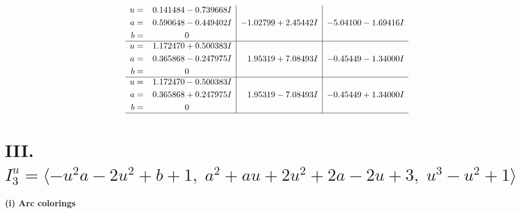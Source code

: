 \documentclass[1p]{elsarticle_modified}
\theoremstyle{definition}
\begin{document}
$$\begin{array}{c|c|c}
\begin{aligned}
u &= \phantom{-}0.141484 - 0.739668 I \\
a &= \phantom{-}0.590648 - 0.449402 I \\
b &= \phantom{-0.000000 } 0\end{aligned}
 & -1.02799 + 2.45442 I & -5.04100 - 1.69416 I \\ \hline\begin{aligned}
u &= \phantom{-}1.172470 + 0.500383 I \\
a &= \phantom{-}0.365868 - 0.247975 I \\
b &= \phantom{-0.000000 } 0\end{aligned}
 & \phantom{-}1.95319 + 7.08493 I & -0.45449 - 1.34000 I \\ \hline\begin{aligned}
u &= \phantom{-}1.172470 - 0.500383 I \\
a &= \phantom{-}0.365868 + 0.247975 I \\
b &= \phantom{-0.000000 } 0\end{aligned}
 & \phantom{-}1.95319 - 7.08493 I & -0.45449 + 1.34000 I\\
 \hline 
 \end{array}$$\newpage\newpage\renewcommand{\arraystretch}{1}
\centering \section*{III. $I^u_{3}= \langle - u^2 a-2 u^2+b+1,\;a^2+a u+2 u^2+2 a-2 u+3,\;u^3- u^2+1 \rangle$}
\flushleft \textbf{(i) Arc colorings}\\
\end{document}
